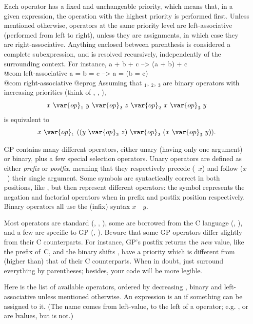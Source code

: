 Each operator has a fixed and unchangeable priority, which means that, in
a given expression, the operation with the highest priority is performed
first. Unless mentioned otherwise, operators at the same priority level are
left-associative (performed from left to right), unless they are assignments,
in which case they are right-associative. Anything enclosed between
parenthesis is considered a complete subexpression, and is resolved
recursively, independently of the surrounding context. For instance,
\bprog
  a + b + c    -->   (a + b) + c     \\@com left-associative
  a = b = c    -->   a = (b = c)     \\@com right-associative
@eprog\noindent
Assuming that $_1$, $_2$, $_3$ are
binary operators with increasing priorities (think of \kbd{+},
\kbd{*}, \kbd{\pow}),
$$ x~\var{op}_1~y~\var{op}_2~z~\var{op}_2~x~\var{op}_3~y $$ is
equivalent to $$ x~\var{op}_1~((y~\var{op}_2~z)~\var{op}_2~
(x~\var{op}_3~y)).$$

GP contains many different operators, either unary (having only
one argument) or binary, plus a few special selection operators. Unary
operators are defined as either \emph{prefix}  or \emph{postfix}, meaning
that they respectively precede (~$x$) and follow ($x$~) their
single argument. Some symbols are syntactically correct in both positions,
like \kbd{!}, but then represent different operators: the \kbd{!} symbol
represents the negation and factorial operators when in prefix and postfix
position respectively. Binary operators all use the (infix) syntax
$x$~~$y$.

Most operators are standard (\kbd{+}, \kbd{\%}, \kbd{=}), some are
borrowed from the C language (\kbd{++}, \kbd{<<}), and a few are
specific to GP (\kbd{\bs}, \kbd{\#}). Beware that some GP operators differ
slightly from their C counterparts. For instance, GP's postfix \kbd{++}
returns the \emph{new} value, like the prefix \kbd{++} of~C, and the binary
shifts \kbd{<<}, \kbd{>>} have a priority which is different from (higher
than) that of their C counterparts. When in doubt, just surround everything
by parentheses; besides, your code will be more legible.

\noindent Here is the list of available operators, ordered by decreasing
, binary and left-associative unless mentioned otherwise. An
expression is an  if something can be assigned to it. (The name
comes from left-value, to the left of a \kbd{=} operator; e.g.
, or  are lvalues, but  is not.)

